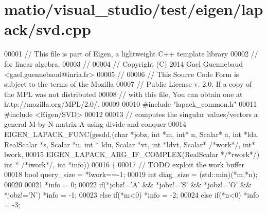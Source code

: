 \hypertarget{matio_2visual__studio_2test_2eigen_2lapack_2svd_8cpp_source}{}\section{matio/visual\+\_\+studio/test/eigen/lapack/svd.cpp}
\label{matio_2visual__studio_2test_2eigen_2lapack_2svd_8cpp_source}

\begin{DoxyCode}
00001 \textcolor{comment}{// This file is part of Eigen, a lightweight C++ template library}
00002 \textcolor{comment}{// for linear algebra.}
00003 \textcolor{comment}{//}
00004 \textcolor{comment}{// Copyright (C) 2014 Gael Guennebaud <gael.guennebaud@inria.fr>}
00005 \textcolor{comment}{//}
00006 \textcolor{comment}{// This Source Code Form is subject to the terms of the Mozilla}
00007 \textcolor{comment}{// Public License v. 2.0. If a copy of the MPL was not distributed}
00008 \textcolor{comment}{// with this file, You can obtain one at http://mozilla.org/MPL/2.0/.}
00009 
00010 \textcolor{preprocessor}{#include "lapack\_common.h"}
00011 \textcolor{preprocessor}{#include <Eigen/SVD>}
00012 
00013 \textcolor{comment}{// computes the singular values/vectors a general M-by-N matrix A using divide-and-conquer}
00014 EIGEN\_LAPACK\_FUNC(gesdd,(\textcolor{keywordtype}{char} *jobz, \textcolor{keywordtype}{int} *m, \textcolor{keywordtype}{int}* n, Scalar* a, \textcolor{keywordtype}{int} *lda, RealScalar *s, Scalar *u, \textcolor{keywordtype}{int} *
      ldu, Scalar *vt, \textcolor{keywordtype}{int} *ldvt, Scalar* \textcolor{comment}{/*work*/}, \textcolor{keywordtype}{int}* lwork,
00015                          EIGEN\_LAPACK\_ARG\_IF\_COMPLEX(RealScalar *\textcolor{comment}{/*rwork*/}) \textcolor{keywordtype}{int} * \textcolor{comment}{/*iwork*/}, \textcolor{keywordtype}{int} *info))
00016 \{
00017   \textcolor{comment}{// TODO exploit the work buffer}
00018   \textcolor{keywordtype}{bool} query\_size = *lwork==-1;
00019   \textcolor{keywordtype}{int} diag\_size = (std::min)(*m,*n);
00020   
00021   *info = 0;
00022         \textcolor{keywordflow}{if}(*jobz!=\textcolor{charliteral}{'A'} && *jobz!=\textcolor{charliteral}{'S'} && *jobz!=\textcolor{charliteral}{'O'} && *jobz!=\textcolor{charliteral}{'N'})  *info = -1;
00023   \textcolor{keywordflow}{else}  \textcolor{keywordflow}{if}(*m<0)                                                  *info = -2;
00024   \textcolor{keywordflow}{else}  \textcolor{keywordflow}{if}(*n<0)                                                  *info = -3;

\end{DoxyCode}
